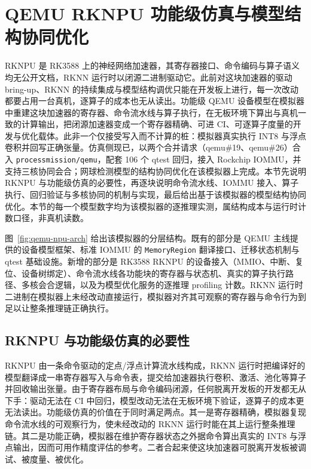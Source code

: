 \section{QEMU RKNPU 功能级仿真与模型结构协同优化}

RKNPU 是 RK3588 上的神经网络加速器，其寄存器接口、命令编码与算子语义均无公开文档，RKNN 运行时以闭源二进制驱动它。此前对这块加速器的驱动 bring-up、RKNN 的持续集成与模型结构调优只能在开发板上进行，每一次改动都要占用一台真机，逐算子的成本也无从读出。功能级 QEMU 设备模型在模拟器中重建这块加速器的寄存器、命令流水线与算子执行，在无板环境下算出与真机一致的计算输出，把闭源加速器变成一个寄存器精确、可进 CI、可逐算子度量的开发与优化载体。此非一个仅接受写入而不计算的桩：模拟器真实执行 INT8 与浮点卷积并回写正确张量。仿真侧现已，以两个合并请求（qemu\#19、qemu\#26）合入 \texttt{processmission/qemu}，配套 106 个 qtest 回归，接入 Rockchip IOMMU，并支持三核协同会合；网球检测模型的结构协同优化在该模拟器上完成。本节先说明 RKNPU 与功能级仿真的必要性，再逐块说明命令流水线、IOMMU 接入、算子执行、回归验证与多核协同的机制与实现，最后给出基于该模拟器的模型结构协同优化。本节的每一个模型数字均为该模拟器的逐推理实测，属结构成本与运行时计数口径，非真机读数。


图~\ref{fig:qemu-npu-arch} 给出该模拟器的分层结构。既有的部分是 QEMU 主线提供的设备模型框架、标准 IOMMU 的 \texttt{MemoryRegion} 翻译接口、迁移状态机制与 qtest 基础设施。新增的部分是 RK3588 RKNPU 的设备接入（MMIO、中断、复位、设备树绑定）、命令流水线各功能块的寄存器与状态机、真实的算子执行路径、多核会合逻辑，以及为模型优化服务的逐推理 profiling 计数。RKNN 运行时二进制在模拟器上未经改动直接运行，模拟器对齐其可观察的寄存器与命令行为到足以让整条推理链正确执行。

\subsection{RKNPU 与功能级仿真的必要性}

RKNPU 由一条命令驱动的定点/浮点计算流水线构成，RKNN 运行时把编译好的模型翻译成一串寄存器写入与命令表，提交给加速器执行卷积、激活、池化等算子并回收输出张量。由于寄存器布局与命令编码闭源，任何脱离开发板的开发都无从下手：驱动无法在 CI 中回归，模型改动无法在无板环境下验证，逐算子的成本更无法读出。功能级仿真的价值在于同时满足两点。其一是寄存器精确，模拟器复现命令流水线的可观察行为，使未经改动的 RKNN 运行时能在其上运行整条推理链。其二是功能正确，模拟器在维护寄存器状态之外据命令算出真实的 INT8 与浮点输出，因而可用作精度评估的参考。二者合起来使这块加速器可脱离开发板被调试、被度量、被优化。


